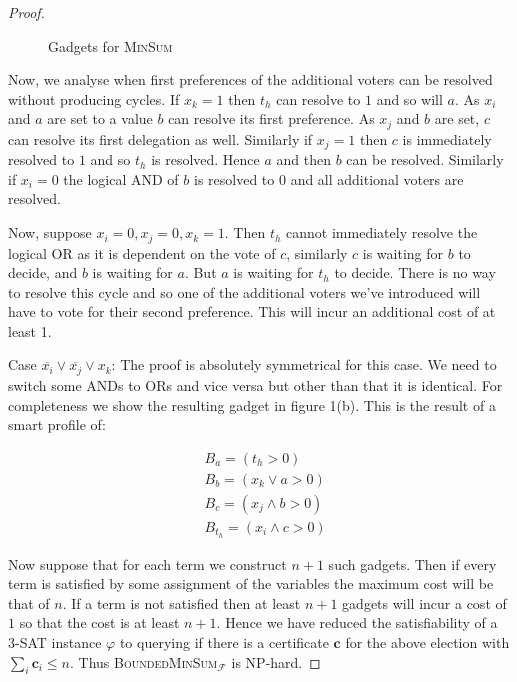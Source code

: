\documentclass[11pt,a4paper, titlepage]{article}
\theoremstyle{definition}
\let\vec\mathbf
\begin{document}
\begin{proof}
\begin{figure}[h]
{{
    }}
    \caption{Gadgets for \textsc{MinSum}}
    \end{figure}
    
    Now, we analyse when first preferences of the additional voters can be resolved without producing cycles. 
    If $x_k = 1$ then $t_h$ can resolve to $1$ and so will $a$. As $x_i$ and $a$ are set to a value $b$ can resolve its first preference. 
    As $x_j$ and $b$ are set, $c$ can resolve its first delegation as well. 
    Similarly if $x_j = 1$ then $c$ is immediately resolved to $1$ and so $t_h$ is resolved. 
    Hence $a$ and then $b$ can be resolved. 
    Similarly if $x_i = 0$ the logical AND of $b$ is resolved to $0$ and all additional voters are resolved.
    
    Now, suppose $x_i = 0, x_j = 0, x_k = 1$. Then $t_h$ cannot immediately resolve the logical OR as it is dependent on the vote of $c$, similarly $c$ is waiting for $b$ to decide, and $b$ is waiting for $a$. But $a$ is waiting for $t_h$ to decide. There is no way to resolve this cycle and so one of the additional voters we've introduced will have to vote for their second preference. This will incur an additional cost of at least 1.

    Case $\overline{x_i} \lor \overline{x_j} \lor x_k$: The proof is absolutely symmetrical for this case. We need to switch some ANDs to ORs and vice versa but other than that it is identical. For completeness we show the resulting gadget in figure 1(b). This is the result of a smart profile of:

    \begin{align*}
        &B_a = (t_h > 0) \\
        &B_b = (x_k \lor a > 0) \\
        &B_c = (x_j \land b > 0) \\
        &B_{t_h} = (x_i \land c > 0)
    \end{align*}

    Now suppose that for each term we construct $n + 1$ such gadgets. Then if every term is satisfied by some assignment of the variables the maximum cost will be that of $n$. If a term is not satisfied then at least $n+1$ gadgets will incur a cost of $1$ so that the cost is at least $n+1$. Hence we have reduced the satisfiability of a \textsc{3-SAT} instance $\varphi$ to querying if there is a certificate $\vec{c}$ for the above election with $\sum_{i} \vec{c}_i \leq n$. Thus \textsc{BoundedMinSum}$_\mathcal{F}$ is NP-hard.
\end{proof}
\end{document}
